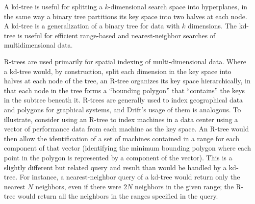 \begin{figure}
  \label{fig:r-tree}
\end{figure}

A kd-tree is useful for splitting a $k$-dimensional search
space into hyperplanes, in the same way a binary tree partitions its key space into two halves at each
node.  A kd-tree is a generalization of a binary tree for data with $k$ dimensions.  The kd-tree is
useful for efficient range-based and nearest-neighbor searches of multidimensional data.  

R-trees are used primarily for spatial indexing of multi-dimensional data.  Where a kd-tree would, by
construction, split each dimension in the key space into halves at each node of the tree, an R-tree
organizes its key space hierarchically, in that each node in the tree forms a ``bounding polygon'' that
``contains'' the keys in the subtree beneath it.  R-trees are generally used to index geographical data
and polygons for graphical systems, and Drift's usage of them is analogous.  To illustrate, consider
using an R-tree to index machines in a data center using a vector of performance data from each machine
as the key space.  An R-tree would then allow the identification of a set of machines contained in a
range for each component of that vector (identifying the minimum bounding polygon where each point in the
polygon is represented by a component of the vector).  This is a slightly different but related query and
result than would be handled by a kd-tree.  For instance, a nearest-neighbor query of a kd-tree would
return only the nearest $N$ neighbors, even if there were $2N$ neighbors in the given range; the R-tree
would return all the neighbors in the ranges specified in the query.

